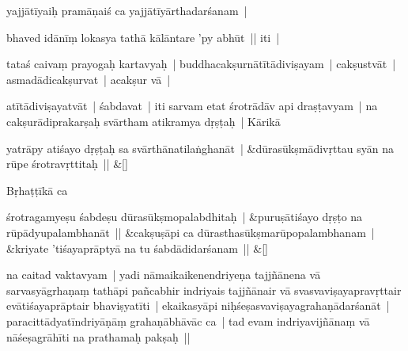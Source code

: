 \documentclass[article,12pt,a4paper]{memoir}%
\newcommand{\name}[1]{#1}
\newcounter{parCount}
\begin{document}
	  \pstart \leavevmode%
	yajjātīyaiḥ pramāṇaiś ca yajjātīyārthadarśanam | 
	{}
	\pend%
      

	  \pstart \leavevmode%
	bhaved idānīṃ lokasya tathā kālāntare 'py abhūt || iti | 
	{}
	\pend%
      

	  \pstart \leavevmode%
	tataś caivaṃ prayogaḥ kartavyaḥ | buddhacakṣurnātītādiviṣayam | cakṣustvāt | asmadādicakṣurvat | acakṣur vā | 
	{}
	\pend%
      

	  \pstart \leavevmode%
	atītādiviṣayatvāt | śabdavat | iti sarvam etat śrotrādāv api draṣṭavyam | na cakṣurādiprakarṣaḥ svārtham atikramya dṛṣṭaḥ | \name{Kārikā}
	{}
	\pend%
      
	    
	    \stanza[\smallbreak]
	  yatrāpy atiśayo dṛṣṭaḥ sa svārthānatilaṅghanāt | &dūrasūkṣmādivṛttau syān na rūpe śrotravṛttitaḥ || \&[\smallbreak]
	  
	  
	  

	  \pstart \leavevmode%
	\name{Bṛhaṭṭīkā} ca
	{}
	\pend%
      
	    
	    \stanza[\smallbreak]
	  śrotragamyeṣu śabdeṣu dūrasūkṣmopalabdhitaḥ | &puruṣātiśayo dṛṣṭo na rūpādyupalambhanāt || &cakṣuṣāpi ca dūrasthasūkṣmarūpopalambhanam | &kriyate 'tiśayaprāptyā na tu śabdādidarśanam || \&[\smallbreak]
	  
	  
	  

	  \pstart \leavevmode%
	\label{thakur75-8.13}na caitad vaktavyam | yadi nāmaikaikenendriyeṇa tajjñānena vā sarvasyāgrhaṇaṃ tathāpi pañcabhir indriyais tajjñānair vā svasvaviṣayapravṛttair evātiśayaprāptair bhaviṣyatīti | ekaikasyāpi niḥśeṣasvaviṣayagrahaṇādarśanāt | paracittādyatīndriyāṇāṃ grahaṇābhāvāc ca | tad evam indriyavijñānaṃ vā nāśeṣagrāhīti na prathamaḥ pakṣaḥ || 
	{}
	\pend%
      
\end{document}
